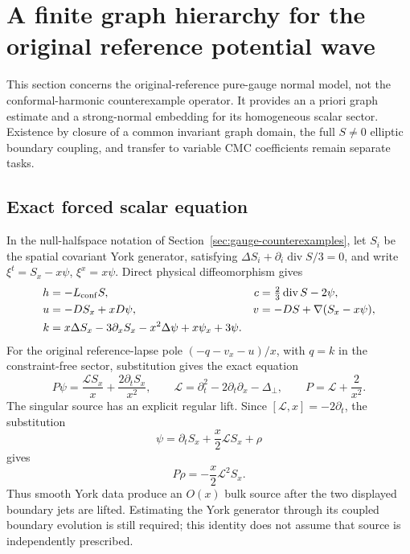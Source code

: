 \section{A finite graph hierarchy for the original reference potential wave}
\label{sec:original-gauge-graph}

This section concerns the original-reference pure-gauge normal model, not the
conformal-harmonic counterexample operator.  It provides an a priori graph
estimate and a strong-normal embedding for its homogeneous scalar sector.
Existence by closure of a common invariant graph domain, the full $S\ne0$
elliptic boundary coupling, and transfer to variable CMC coefficients remain
separate tasks.

\subsection{Exact forced scalar equation}

In the null-halfspace notation of Section~\ref{sec:gauge-counterexamples},
let $S_i$ be the spatial covariant York generator, satisfying
$\Delta S_i+\partial_i\operatorname{div}S/3=0$, and write
$\xi^t=S_x-x\psi$, $\xi^x=x\psi$.  Direct physical diffeomorphism gives
\begin{align*}
 h&=-L_{\rm conf}S,&
 c&=\tfrac23\operatorname{div}S-2\psi,\\
 u&=-D S_x+xD\psi,&
 v&=-DS+\nabla(S_x-x\psi),\\
 k&=x\Delta S_x-3\partial_xS_x-x^2\Delta\psi+x\psi_x+3\psi.
\end{align*}
For the original reference-lapse pole $(-q-v_x-u)/x$, with $q=k$ in
the constraint-free sector, substitution gives the exact equation
\[
 P\psi=\frac{\mathcal L S_x}{x}+\frac{2\partial_tS_x}{x^2},\qquad
 \mathcal L=\partial_t^2-2\partial_t\partial_x-\Delta_\perp,
 \qquad P=\mathcal L+\frac2{x^2}.
\]
The singular source has an explicit regular lift.  Since
$[\mathcal L,x]=-2\partial_t$, the substitution
\[
 \psi=\partial_t S_x+\frac{x}{2}\mathcal L S_x+\rho
\]
gives
\begin{equation}
 P\rho=-\frac{x}{2}\mathcal L^2 S_x.
 \label{eq:original-reference-forced-lift}
\end{equation}
Thus smooth York data produce an $O(x)$ bulk source after the two displayed
boundary jets are lifted.  Estimating the York generator through its coupled
boundary evolution is still required; this identity does not assume that
source is independently prescribed.

